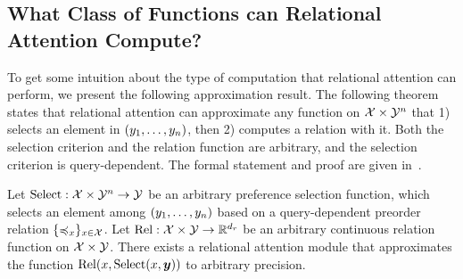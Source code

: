 \subsection{What Class of Functions can Relational Attention Compute?}\label{ssec:approx}

To get some intuition about the type of computation that relational attention can perform, we present the following approximation result. The following theorem states that relational attention can approximate any function on ${\mathcal{X}} \times {\mathcal{Y}}^n$ that 1) selects an element in $(y_1, \ldots, y_n)$, then 2) computes a relation with it. Both the selection criterion and the relation function are arbitrary, and the selection criterion is query-dependent. The formal statement and proof are given in~.
\begin{theorem}[Informal]\label{theorem:func_class}
  Let $\mathrm{Select}: {\mathcal{X}} \times {\mathcal{Y}}^n \to {\mathcal{Y}}$ be an arbitrary preference selection function, which selects an element among $(y_1, \ldots, y_n)$ based on a query-dependent preorder relation $\{\preccurlyeq_x\}_{x \in {\mathcal{X}}}$. Let $\mathrm{Rel}: {\mathcal{X}} \times {\mathcal{Y}} \to \mathbb{R}^{d_r}$ be an arbitrary continuous relation function on ${\mathcal{X}} \times {\mathcal{Y}}$. There exists a relational attention module that approximates the function $\mathrm{Rel}(x, \mathrm{Select}(x, \bm{y}))$ to arbitrary precision.
\end{theorem}
